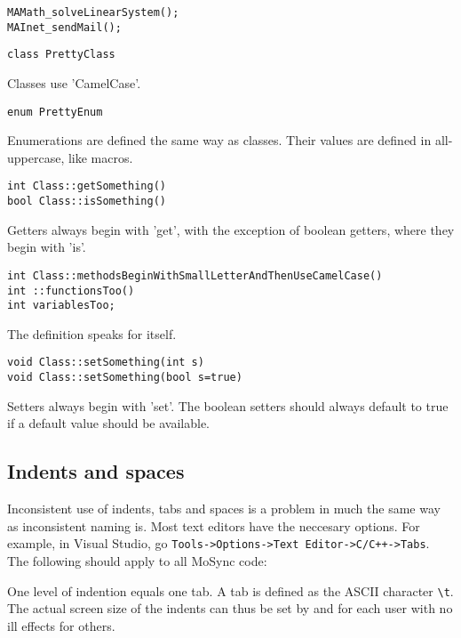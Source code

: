\documentclass {article}
\begin{document}
\begin{verbatim}
MAMath_solveLinearSystem();
MAInet_sendMail();
\end{verbatim}

\begin{verbatim} 
class PrettyClass
\end{verbatim}

Classes use 'CamelCase'.

\begin{verbatim} 
enum PrettyEnum
\end{verbatim}

Enumerations are defined the same way as classes. Their values are defined in all-uppercase, like macros.

\begin{verbatim} 
int Class::getSomething()
bool Class::isSomething()
\end{verbatim}

Getters always begin with 'get', with the exception of boolean getters, where they begin with 'is'.

\begin{verbatim} 
int Class::methodsBeginWithSmallLetterAndThenUseCamelCase()
int ::functionsToo()
int variablesToo;
\end{verbatim}

The definition speaks for itself.

\begin{verbatim} 
void Class::setSomething(int s)
void Class::setSomething(bool s=true)
\end{verbatim}

Setters always begin with 'set'. The boolean setters should always default to true if a default value should be available.

\setlength{\parskip}{12pt}
\setlength{\parindent}{0pt}

\subsection{Indents and spaces}

Inconsistent use of indents, tabs and spaces is a problem in much the same way as inconsistent naming is. Most text editors have the neccesary options. For example, in Visual Studio, go \verb|Tools->Options->Text Editor->C/C++->Tabs|. The following should apply to all MoSync code:

One level of indention equals one tab. A tab is defined as the ASCII character \verb|\t|. The actual screen size of the indents can thus be set by and for each user with no ill effects for others.
\end{document}

